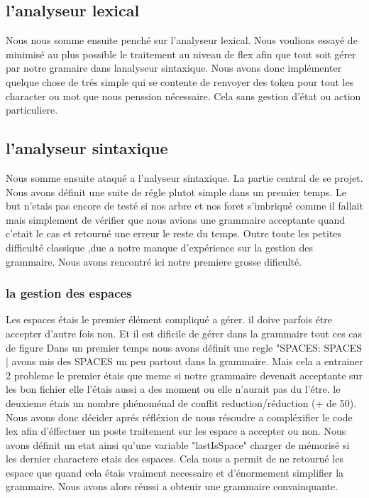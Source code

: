 \documentclass[12pt]{article}
\begin{document}
\subsection{l'analyseur lexical}

Nous nous somme ensuite penché sur l'analyseur lexical. Nous voulions essayé de
minimisé au plus possible le traitement au niveau de flex afin que tout soit gérer
par notre gramaire dans lanalyseur sintaxique. Nous avons donc implémenter
quelque chose de trés simple qui se contente de renvoyer des token pour tout les
character ou mot que nous penssion nécessaire. Cela sans gestion d'état ou action
particuliere.

\subsection{l'analyseur sintaxique}

Nous somme ensuite ataqué a l'nalyseur sintaxique. La partie central de se projet.
Nous avons définit une suite de régle plutot simple dans un premier temps. Le but
n'etais pas encore de testé si nos arbre et nos foret s'imbriqué comme il fallait
mais simplement de vérifier que nous avions une grammaire acceptante quand c'etait
le cas et retourné une erreur le reste du temps.
\newline
Outre toute les petites difficulté classique ,due a notre manque d'expérience
sur la gestion des grammaire. Nous avons rencontré ici notre premiere
grosse dificulté.

\subsubsection{la gestion des espaces}

Les espaces étais le premier élément compliqué a gérer. il doive parfois étre accepter
d'autre fois non. Et il est dificile de gérer dans la grammaire tout ces cas de figure
Dans un premier temps nous avons définit une regle "SPACES: SPACES | %
avons mis des SPACES un peu partout dans la grammaire. Mais cela a entrainer 2 probleme
le premier étais que meme si notre grammaire devenait acceptante sur les bon fichier
elle l'étais aussi a des moment ou elle n'aurait pas du l'étre. le deuxieme étais un
nombre phénoménal de conflit reduction/réduction (+ de 50).
\newline
Nous avons donc décider aprés réfléxion de nous résoudre a compléxifier le code lex
afin d'éffectuer un poste traitement sur les espace a accepter ou non.
Nous avons définit un etat ainsi qu'une variable "lastIsSpace" charger de mémorisé
si les dernier charactere etais des espaces. Cela nous a permit de ne retourné les
espace que quand cela étais vraiment necessaire et d'énormement simplifier la grammaire.
Nous avons alors réussi a obtenir une grammaire convainquante.
\end{document}
